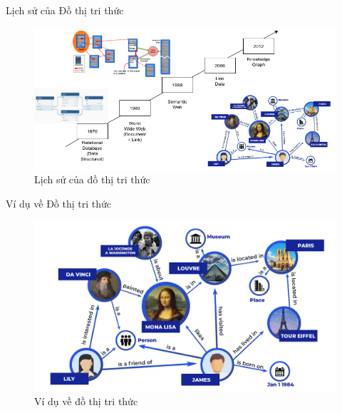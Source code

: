 \documentclass[notheorems, aspectratio=54]{beamer}
\begin{document}
	\begin{frame}{Lịch sử của Đồ thị tri thức}
		\begin{figure}[H]
			\includegraphics[width=1\linewidth]{figs/history_kg.png}
			\caption{Lịch sử của đồ thị tri thức}
			\label{fig:writing-thesis}
		\end{figure}
	\end{frame}
	\begin{frame}{Ví dụ về Đồ thị tri thức}
		\begin{figure}[H]
			\includegraphics[width=1\linewidth]{figs/knowledge-graph.jpg}
			\caption{Ví dụ về đồ thị tri thức}
			\label{fig:writing-thesis}
		\end{figure}
	
	
	
	\end{frame}
\end{document}
